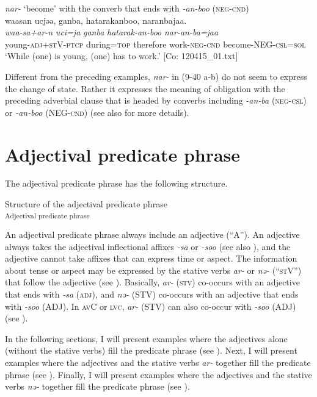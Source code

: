 \ex\textit{nar-} ‘become’ with the converb that ends with \textit{{}-an-boo} (\textsc{neg}-\textsc{cnd})\\
 \glll  waasan  ucjəə,  ganba,  hatarakanboo, naranbajaa.\\
    \textit{waa-sa+ar-n}  \textit{uci=ja}  \textit{ganba}  \textit{hatarak-an-boo}  \textit{nar-an-ba=jaa}\\
    young-\textsc{adj}+\textsc{st}V-\textsc{ptcp}  during=\textsc{top}  therefore  work-\textsc{neg}-\textsc{cnd}  become-NEG-\textsc{csl}=\textsc{sol}\\
  \glt     ‘While (one) is young, (one) has to work.’ [Co: 120415\_01.txt]
  \z
\z

Different from the preceding examples, \textit{nar-} in (9-40 a-b) do not seem to express the change of state. Rather it expresses the meaning of obligation with the preceding adverbial clause that is headed by converbs including \textit{{}-an-ba} (\textsc{neg}-\textsc{csl}) or \textit{{}-an-boo} (NEG-\textsc{cnd}) (see also  for more details).

\section{Adjectival predicate phrase}\label{sec:9.2}

The adjectival predicate phrase has the following structure.

\ea   Structure of the adjectival predicate phrase \label{ex:9.41}\\\textsubscript{Adjectival predicate phrase}
\z

An adjectival predicate phrase always include an adjective (“A”). An adjective always takes the adjectival inflectional affixes \textit{{}-sa} or \textit{{}-soo} (see also ), and the adjective cannot take affixes that can express time or aspect. The information about tense or aspect may be expressed by the stative verbs \textit{ar-} or \textit{nə-} (“\textsc{st}V”) that follow the adjective (see ). Basically, \textit{ar-} (\textsc{stv}) co-occurs with an adjective that ends with \textit{{}-sa} (\textsc{adj}), and \textit{nə-} (STV) co-occurs with an adjective that ends with \textit{{}-soo} (ADJ). In \textsc{av}C or \textsc{lvc}, \textit{ar-} (STV) can also co-occur with \textit{{}-soo} (ADJ) (see ).

  In the following sections, I will present examples where the adjectives alone (without the stative verbs) fill the predicate phrase (see ). Next, I will present examples where the adjectives and the stative verbs \textit{ar-} together fill the predicate phrase (see ). Finally, I will present examples where the adjectives and the stative verbs \textit{nə-} together fill the predicate phrase (see ).


